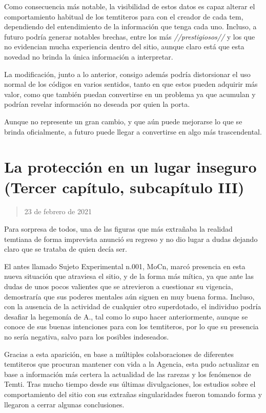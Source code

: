 \documentclass[
  spanish,
]{book}
\begin{document}
Como consecuencia más notable, la visibilidad de estos datos es capaz alterar el comportamiento habitual de los temtiteros para con el creador de cada tem, dependiendo del entendimiento de la información que tenga cada uno. Incluso, a futuro podría generar notables brechas, entre los más \emph{//prestigiosos//} y los que no evidencian mucha experiencia dentro del sitio, aunque claro está que esta novedad no brinda la única información a interpretar.

La modificación, junto a lo anterior, consigo además podría distorsionar el uso normal de los códigos en varios sentidos, tanto en que estos pueden adquirir más valor, como que también puedan convertirse en un problema ya que acumulan y podrían revelar información no deseada por quien la porta.

Aunque no represente un gran cambio, y que aún puede mejorarse lo que se brinda oficialmente, a futuro puede llegar a convertirse en algo más trascendental.

\hypertarget{la-protecciuxf3n-en-un-lugar-inseguro-tercer-capuxedtulo-subcapuxedtulo-iii}{%
\section{La protección en un lugar inseguro (Tercer capítulo, subcapítulo III)}\label{la-protecciuxf3n-en-un-lugar-inseguro-tercer-capuxedtulo-subcapuxedtulo-iii}}

\begin{quote}
23 de febrero de 2021
\end{quote}

Para sorpresa de todos, una de las figuras que más extrañaba la realidad temtiana de forma imprevista anunció su regreso y no dio lugar a dudas dejando claro que se trataba de quien decía ser.

El antes llamado Sujeto Experimental n.001, MoCn, marcó presencia en esta nueva situación que atraviesa el sitio, y de la forma más mítica, ya que ante las dudas de unos pocos valientes que se atrevieron a cuestionar su vigencia, demostraría que sus poderes mentales aún siguen en muy buena forma. Incluso, con la ausencia de la actividad de cualquier otro superdotado, el individuo podría desafiar la hegemonía de A., tal como lo supo hacer anteriormente, aunque se conoce de sus buenas intenciones para con los temtiteros, por lo que su presencia no sería negativa, salvo para los posibles indeseados.

Gracias a esta aparición, en base a múltiples colaboraciones de diferentes temtiteros que procuran mantener con vida a la Agencia, esta pudo actualizar en base a información más certera la actualidad de las rarezas y los fenómenos de Temti. Tras mucho tiempo desde sus últimas divulgaciones, los estudios sobre el comportamiento del sitio con sus extrañas singularidades fueron tomando forma y llegaron a cerrar algunas conclusiones.
\end{document}

